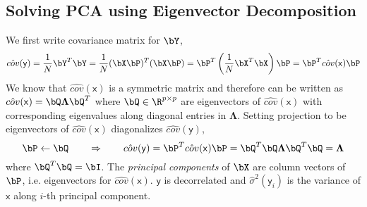 \documentclass[11pt]{article}
\newcommand\ry{\ensuremath{\mathsf{y}}}
\newcommand\rx{\ensuremath{\mathsf{x}}}
\begin{document}
\subsection{Solving PCA using Eigenvector Decomposition}

We first write covariance matrix for $\bY$,
\[
    \hat{cov}(\ry)
    = \frac{1}{N} \bY^T \bY
    = \frac{1}{N} (\bX\bP)^T (\bX\bP)
    = \bP^T \left( \frac{1}{N} \bX^T\bX \right) \bP
    = \bP^T \hat{cov}(\rx) \bP
\]
We know that $\hat{cov}(\rx)$ is a symmetric matrix and therefore can be written as $\hat{cov}(\rx) = \bQ \boldsymbol{\Lambda} \bQ^T$ where $\bQ \in \R^{p\times p}$ are eigenvectors of $\hat{cov}(\rx)$ with corresponding eigenvalues along diagonal entries in $\boldsymbol{\Lambda}$. Setting projection to be eigenvectors of $\hat{cov}(\rx)$ diagonalizes $\hat{cov}(\ry)$,
\[
    \bP \leftarrow \bQ
    \quad\quad \Rightarrow \quad\quad
    \hat{cov}(\ry)
    = \bP^T \hat{cov}(\rx) \bP
    = \bQ^T \bQ \boldsymbol{\Lambda} \bQ^T \bQ
    = \boldsymbol{\Lambda} 
\]
where $\bQ^T\bQ = \bI$. The \textit{principal components} of $\bX$ are column vectors of $\bP$, i.e. eigenvectors for $\hat{cov}(\rx)$. $\ry$ is decorrelated and $\hat{\sigma}^2(\ry_i)$ is the variance of $\rx$ along $i$-th principal component.
\end{document}
